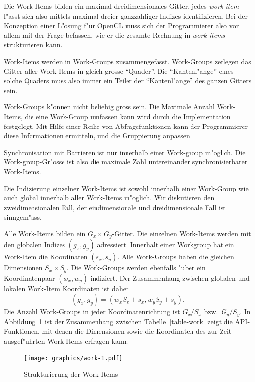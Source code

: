 Die Work-Items bilden ein maximal dreidimensionales Gitter, jedes
{\em work-item} l"asst sich also mittels maximal dreier ganzzahliger 
Indizes identifizieren.
Bei der Konzeption einer L"osung f"ur OpenCL muss sich der
Programmierer also vor allem mit der Frage befassen, wie er die
gesamte Rechnung in {\em work-items} strukturieren kann. 

Work-Items werden in Work-Groups zusammengefasst.
Work-Groups zerlegen das Gitter aller Work-Items in gleich grosse ``Quader''.
Die ``Kantenl"ange'' eines solche Quaders muss also immer ein Teiler
der  ``Kantenl"ange'' des ganzen Gitters sein.

Work-Groups k"onnen nicht beliebig gross sein.
Die Maximale Anzahl Work-Items, die eine Work-Group umfassen kann
wird durch die Implementation festgelegt. 
Mit Hilfe einer Reihe von Abfragefunktionen kann der Programmierer
diese Informationen ermitteln, und die Gruppierung anpassen.

Synchronisation mit Barrieren ist nur innerhalb einer Work-group
m"oglich.
Die Work-group-Gr"osse ist also die maximale Zahl untereinander
synchronisierbarer Work-Items.

Die Indizierung einzelner Work-Items ist sowohl innerhalb einer
Work-Group wie auch global innerhalb aller Work-Items m"oglich.
Wir diskutieren den zweidimensionalen Fall, der eindimensionale und
dreidimensionale Fall ist sinngem"ass. 

Alle Work-Items bilden ein $G_x\times G_y$-Gitter. Die einzelnen
Work-Items werden mit den globalen Indizes $(g_x,g_y)$ adressiert.
Innerhalt einer Workgroup hat ein Work-Item die Koordinaten
$(s_x, s_y)$.
Alle Work-Groups haben die gleichen Dimensionen $S_x\times S_y$.
Die Work-Groups werden ebenfalls "uber ein Koordinatenpaar $(w_x,w_y)$
indiziert. Der Zusammenhang zwischen globalen und lokalen Work-Item
Koordinaten ist daher
\[
(g_x, g_y)=(w_xS_x + s_x, w_yS_y+s_y).
\]
Die Anzahl Work-Groups in jeder Koordinatenrichtung ist $G_x/S_x$
bzw.~$G_y/S_y$.
In Abbildung~\ref{opencl-workitems} ist der Zusammenhang zwischen
Tabelle~\ref{table-work} zeigt die API-Funktionen, mit denen
die Dimensionen sowie die Koordinaten des zur Zeit ausgef"uhrten
Work-Items erfragen kann.

\begin{figure}
\begin{center}
\texttt{[image: graphics/work-1.pdf]}
\end{center}
\caption{Strukturierung der Work-Items
\label{opencl-workitems}}
\end{figure}

